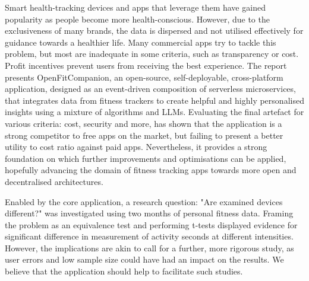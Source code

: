 %
{\singlespacing
Smart health-tracking devices and apps that leverage them have gained popularity as people become more health-conscious. However, due to the exclusiveness of many brands, the data is dispersed and not utilised effectively for guidance towards a healthier life. Many commercial apps try to tackle this problem, but most are inadequate in some criteria, such as transparency or cost. Profit incentives prevent users from receiving the best experience. The report presents OpenFitCompanion, an open-source, self-deployable, cross-platform application, designed as an event-driven composition of serverless microservices, that integrates data from fitness trackers to create helpful and highly personalised insights using a mixture of algorithms and LLMs.  Evaluating the final artefact for various criteria: cost, security and more, has shown that the application is a strong competitor to free apps on the market, but failing to present a better utility to cost ratio against paid apps. Nevertheless, it provides a strong foundation on which further improvements and optimisations can be applied, hopefully advancing the domain of fitness tracking apps towards more open and decentralised architectures.

Enabled by the core application, a research question: "Are examined devices different?" was investigated using two months of personal fitness data. Framing  the problem as an equivalence test and performing t-tests displayed evidence for significant difference in measurement of activity seconds at different intensities. However, the implications are akin to call for a further, more rigorous study,  as user errors and low sample size could have had an impact on the results. We believe that the application should help to facilitate such studies.
}

